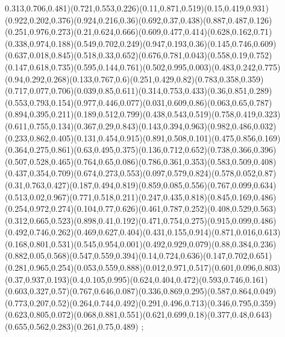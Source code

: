 {0.313,0.706,0.481)(0.721,0.553,0.226)(0.11,0.871,0.519)(0.15,0.419,0.931)(0.922,0.202,0.376)(0.924,0.216,0.36)(0.692,0.37,0.438)(0.887,0.487,0.126)(0.251,0.976,0.273)(0.21,0.624,0.666)(0.609,0.477,0.414)(0.628,0.162,0.71)(0.338,0.974,0.188)(0.549,0.702,0.249)(0.947,0.193,0.36)(0.145,0.746,0.609)(0.637,0.018,0.845)(0.518,0.33,0.652)(0.676,0.781,0.043)(0.558,0.19,0.752)(0.147,0.618,0.735)(0.595,0.144,0.761)(0.502,0.995,0.003)(0.483,0.242,0.775)(0.94,0.292,0.268)(0.133,0.767,0.6)(0.251,0.429,0.82)(0.783,0.358,0.359)(0.717,0.077,0.706)(0.039,0.85,0.611)(0.314,0.753,0.433)(0.36,0.851,0.289)(0.553,0.793,0.154)(0.977,0.446,0.077)(0.031,0.609,0.86)(0.063,0.65,0.787)(0.894,0.395,0.211)(0.189,0.512,0.799)(0.438,0.543,0.519)(0.758,0.419,0.323)(0.611,0.755,0.134)(0.367,0.29,0.843)(0.143,0.394,0.963)(0.982,0.486,0.032)(0.233,0.862,0.405)(0.131,0.454,0.915)(0.891,0.508,0.101)(0.475,0.856,0.169)(0.364,0.275,0.861)(0.63,0.495,0.375)(0.136,0.712,0.652)(0.738,0.366,0.396)(0.507,0.528,0.465)(0.764,0.65,0.086)(0.786,0.361,0.353)(0.583,0.509,0.408)(0.437,0.354,0.709)(0.674,0.273,0.553)(0.097,0.579,0.824)(0.578,0.052,0.87)(0.31,0.763,0.427)(0.187,0.494,0.819)(0.859,0.085,0.556)(0.767,0.099,0.634)(0.513,0.02,0.967)(0.771,0.518,0.211)(0.247,0.435,0.818)(0.845,0.169,0.486)(0.254,0.972,0.274)(0.104,0.77,0.626)(0.461,0.787,0.252)(0.408,0.529,0.563)(0.312,0.665,0.523)(0.898,0.41,0.192)(0.471,0.754,0.275)(0.915,0.099,0.486)(0.492,0.746,0.262)(0.469,0.627,0.404)(0.431,0.155,0.914)(0.871,0.016,0.613)(0.168,0.801,0.531)(0.545,0.954,0.001)(0.492,0.929,0.079)(0.88,0.384,0.236)(0.882,0.05,0.568)(0.547,0.559,0.394)(0.14,0.724,0.636)(0.147,0.702,0.651)(0.281,0.965,0.254)(0.053,0.559,0.888)(0.012,0.971,0.517)(0.601,0.096,0.803)(0.37,0.937,0.193)(0.4,0.105,0.995)(0.624,0.404,0.472)(0.593,0.746,0.161)(0.603,0.327,0.57)(0.767,0.646,0.087)(0.336,0.869,0.295)(0.587,0.864,0.049)(0.773,0.207,0.52)(0.264,0.744,0.492)(0.291,0.496,0.713)(0.346,0.795,0.359)(0.623,0.805,0.072)(0.068,0.881,0.551)(0.621,0.699,0.18)(0.377,0.48,0.643)(0.655,0.562,0.283)(0.261,0.75,0.489)
};